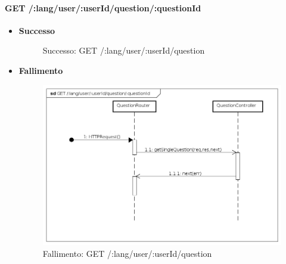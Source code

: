 





\paragraph{GET /:lang/user/:userId/question/:questionId}
\begin{itemize}
\item \textbf{Successo}


\begin{figure}[ht]
	\centering
	\caption{Successo: GET /:lang/user/:userId/question}
\end{figure}
\FloatBarrier

\item \textbf{Fallimento}


\begin{figure}[ht]
	\centering
	\includegraphics[scale=0.45]{UML/DiagrammiDiSequenza/Back-end/GET__lang_user__userId_question__questionId_failure.png}
	\caption{Fallimento: GET /:lang/user/:userId/question}
\end{figure}
\FloatBarrier

\end{itemize}






